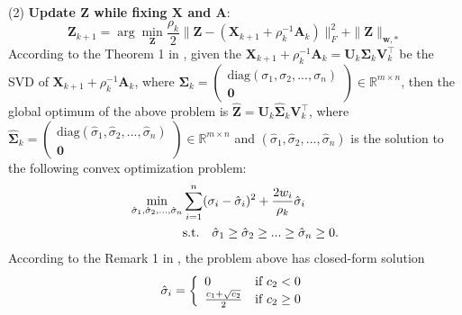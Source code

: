 \documentclass[10pt,twocolumn,letterpaper,sort&compress]{article}
\begin{document}
\\
(2) \textbf{Update $\mathbf{Z}$ while fixing $\mathbf{X}$ and $\mathbf{A}$}:
\vspace{-2mm}
\begin{equation}
\label{e15}
\mathbf{Z}_{k+1}
=
\arg\min_{\mathbf{Z}}\frac{\rho_{k}}{2}
\|\mathbf{Z} - (\mathbf{X}_{k+1}+\rho_{k}^{-1}\mathbf{A}_{k})\|_{F}^{2}
+
\|\mathbf{Z}\|_{\bm{w},*}
\end{equation}
According to the Theorem 1 in \cite{wnnmijcv}, given the $\mathbf{X}_{k+1}+\rho_{k}^{-1}\mathbf{A}_{k}=\mathbf{U}_{k}\mathbf{\Sigma}_{k}\mathbf{V}_{k}^{\top}$ be the SVD of $\mathbf{X}_{k+1}+\rho_{k}^{-1}\mathbf{A}_{k}$, where 
$\mathbf{\Sigma}_{k}=
\left( \begin{array}{c}
\text{diag}(\sigma_{1},\sigma_{2},...,\sigma_{n})
\\
\mathbf{0}
\end{array} \right)
\in\mathbb{R}^{m\times n}$,
then the global optimum of the above problem is 
$\hat{\mathbf{Z}}=\mathbf{U}_{k}\hat{\mathbf{\Sigma}}_{k}\mathbf{V}_{k}^{\top}$, where 
$\hat{\mathbf{\Sigma}}_{k}=
\left( \begin{array}{c}
\text{diag}(\hat{\sigma}_{1},\hat{\sigma}_{2},...,\hat{\sigma}_{n})
\\
\mathbf{0}
\end{array} \right)
\in\mathbb{R}^{m\times n}$
and $(\hat{\sigma}_{1},\hat{\sigma}_{2},...,\hat{\sigma}_{n})$ is the solution to the following convex optimization problem:
\vspace{-3mm}
\begin{equation}
\label{e16}
\vspace{-2mm}
\begin{split}
\min_{\hat{\sigma}_{1},\hat{\sigma}_{2},...,\hat{\sigma}_{n}}
&
\sum_{i=1}^{n}
(\sigma_{i}-\hat{\sigma}_{i})^{2}
+
\frac{2w_{i}}{\rho_{k}}\hat{\sigma}_{i}
\\
&
\text{s.t.}
\quad
\hat{\sigma}_{1}\ge \hat{\sigma}_{2} \ge...\ge \hat{\sigma}_{n}\ge 0.
\end{split}
\end{equation}
According to the Remark 1 in \cite{wnnmijcv}, the problem above has closed-form solution
\vspace{-3mm}
\begin{equation}
\label{e17}
\vspace{-2mm}
\hat{\sigma}_{i}
=
\left\{ \begin{array}{ll}
0 & \textrm{if $c_{2}<0$}\\
\frac{c_{1}+\sqrt{c_{2}}}{2} & \textrm{if $c_{2}\ge 0$}
\end{array} \right.
\end{equation}
\end{document}
